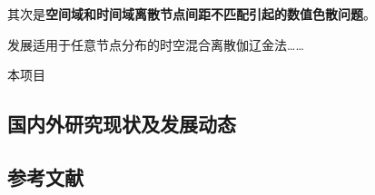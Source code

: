 
其次是\textbf{空间域和时间域离散节点间距不匹配引起的数值色散问题}。

发展适用于任意节点分布的时空混合离散伽辽金法……

本项目

\subsection{国内外研究现状及发展动态}

\vspace{-5pt}

\begin{REF}
	\subsection*{参考文献}
	\vspace{-50pt}
	
\end{REF}

\newpage%

